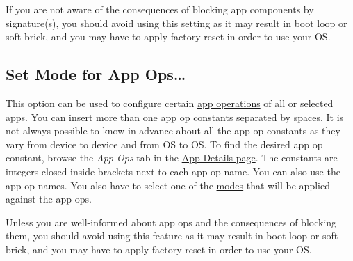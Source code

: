 \begin{danger}[Caution]
    If you are not aware of the consequences of blocking app components by signature(s), you should avoid using this
    setting as it may result in boot loop or soft brick, and you may have to apply factory reset in order to use your OS\@.
\end{danger}

\subsection{Set Mode for App Ops\dots}\label{subsec:set-mode-for-app-ops-dots}
This option can be used to configure certain \hyperref[ch:app-ops]{app operations} of all or selected apps. You can
insert more than one app op constants separated by spaces. It is not always possible to know in advance about all the
app op constants as they vary from device to device and from OS to OS. To find the desired app op constant, browse the
\textit{App Ops} tab in the \hyperref[sec:app-details-page]{App Details page}. The constants are integers closed inside
brackets next to each app op name. You can also use the app op names. You also have to select one of the
\hyperref[subsec:mode-constants]{modes} that will be applied against the app ops.

\begin{danger}[Caution]
    Unless you are well-informed about app ops and the consequences of blocking them, you should avoid using this
    feature as it may result in boot loop or soft brick, and you may have to apply factory reset in order to use your OS\@.
\end{danger}

